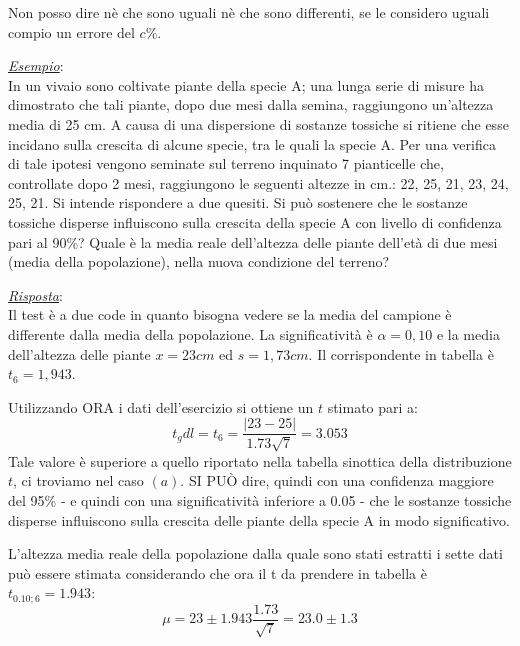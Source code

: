\documentclass[a4paper, 15pt]{article}
\begin{document}
\begin{adjustwidth}{2in}{}
\begin{enumerate}
		Non posso dire nè che sono uguali nè che sono differenti, se le considero uguali compio un errore del $c\%$. 
		\end{enumerate}	
		\textit{\underline{Esempio}}:\\
		In un vivaio sono coltivate piante della specie A; una lunga serie di misure ha dimostrato che tali piante, dopo due mesi dalla semina, raggiungono un’altezza media di 25 cm. A causa di una dispersione di sostanze tossiche si ritiene che esse incidano sulla crescita di alcune specie, tra le quali la specie A. Per una verifica di tale ipotesi vengono seminate sul terreno inquinato 7 pianticelle che, controllate dopo 2 mesi, raggiungono le seguenti altezze in cm.: 22, 25, 21, 23, 24, 25, 21.
		Si intende rispondere a due quesiti.
		Si può sostenere che le sostanze tossiche disperse influiscono sulla crescita della specie A con livello di confidenza pari al 90\%?
		Quale è la media reale dell’altezza delle piante dell’età di due mesi (media della popolazione), nella nuova condizione del terreno?  
		
		\textit{\underline{Risposta}}:\\
		Il test è a due code in quanto bisogna vedere se la media del campione è differente dalla media della popolazione. La significatività è $ \alpha=0,10 $ e la media dell’altezza delle piante $ x=23 cm  $ ed $ s=1,73 cm $. Il corrispondente in tabella è $ t_6=1,943 $. 
		
		Utilizzando ORA i dati dell’esercizio si ottiene un $ t $ stimato pari a:
		\[t_gdl=t_6 =  \dfrac{|23-25|}{1.73{\sqrt{7}}} = 3.053 \]
		Tale valore è superiore a quello riportato nella tabella sinottica della distribuzione $ t $, ci troviamo nel caso $(a)$.
		SI PUÒ dire, quindi con una confidenza maggiore del 95\% - e quindi con una significatività inferiore a 0.05 - che le sostanze tossiche disperse influiscono sulla crescita delle piante della specie A in modo significativo.
		
		L’altezza media reale della popolazione dalla quale sono stati estratti i sette dati può essere stimata considerando che ora il t da prendere in tabella è $ t_{0.10;6}=1.943 $:
		\[\mu = 23 \pm 1.943\dfrac{1.73}{\sqrt{7}} = 23.0\pm1.3\]
\end{adjustwidth}
\end{document}
